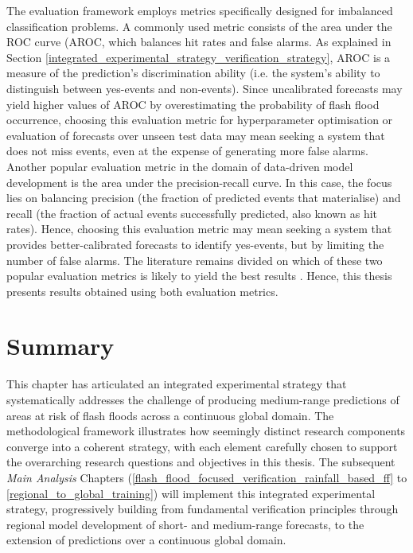 The  evaluation framework employs metrics specifically designed for imbalanced classification problems. A commonly used metric consists of the area under the ROC curve (AROC, which balances hit rates and false alarms. As explained in Section \ref{integrated_experimental_strategy_verification_strategy}, AROC is a measure of the prediction's discrimination ability (i.e. the system's ability to distinguish between yes-events and non-events). Since uncalibrated forecasts may yield higher values of AROC by overestimating the probability of flash flood occurrence, choosing this evaluation metric for hyperparameter optimisation or evaluation of forecasts over unseen test data may mean seeking a system that does not miss events, even at the expense of generating more false alarms. Another popular evaluation metric in the domain of data-driven model development is the area under the precision-recall curve. In this case, the focus lies on balancing precision (the fraction of predicted events that materialise) and recall (the fraction of actual events successfully predicted, also known as hit rates). Hence, choosing this evaluation metric may mean seeking a system that provides better-calibrated forecasts to identify yes-events, but by limiting the number of false alarms. The literature remains divided on which of these two popular evaluation metrics is likely to yield the best results \citep{Richardson_2024, Saito_2015}. Hence, this thesis presents results obtained using both evaluation metrics.


\section{Summary}

This chapter has articulated an integrated experimental strategy that systematically addresses the challenge of producing medium-range predictions of areas at risk of flash floods across a continuous global domain. The methodological framework illustrates how seemingly distinct research components converge into a coherent strategy, with each element carefully chosen to support the overarching research questions and objectives in this thesis. The subsequent \textit{Main Analysis} Chapters (\ref{flash_flood_focused_verification_rainfall_based_ff} to \ref{regional_to_global_training}) will implement this integrated experimental strategy, progressively building from fundamental verification principles through regional model development of short- and medium-range forecasts, to the extension of predictions over a continuous global domain.